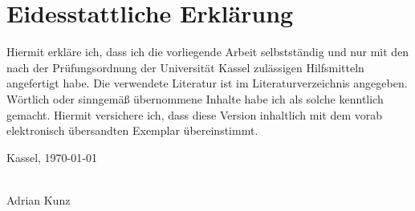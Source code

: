 \chapter*{Eidesstattliche Erklärung}


Hiermit erkläre ich, dass ich die vorliegende Arbeit selbstständig und nur mit den nach der Prüfungsordnung der Universität Kassel zulässigen Hilfsmitteln angefertigt habe.
Die verwendete Literatur ist im Literaturverzeichnis angegeben.
Wörtlich oder sinngemäß übernommene Inhalte habe ich als solche kenntlich gemacht.
Hiermit versichere ich, dass diese Version inhaltlich mit dem vorab elektronisch übersandten Exemplar übereinstimmt.

\vspace{1cm}

Kassel, \today

\begin{flushright}
  \underline{\hspace{7cm}} \\
  Adrian Kunz
\end{flushright}

